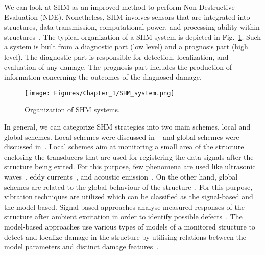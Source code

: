 We can look at SHM as an improved method to perform Non-Destructive Evaluation (NDE). 
Nonetheless, SHM involves sensors that are integrated into structures, data 
transmission, computational power, and processing ability within 
structures~\cite{Balageas2010}. 
The typical organization of a SHM system is depicted in Fig.~\ref{fig:SHMsystem}. 
Such a system is built from a diagnostic part (low level) and a prognosis part (high level).
The diagnostic part is responsible for detection, localization, and evaluation of any damage.
The prognosis part includes the production of information concerning the outcomes of the diagnosed damage.
\begin{figure} [!ht]
	\begin{center}
		\texttt{[image: Figures/Chapter\_1/SHM\_system.png]}
	\end{center}
	\caption{Organization of SHM systems.} 
	\label{fig:SHMsystem}
\end{figure}
In general, we can categorize SHM strategies into two main schemes, local and 
global schemes. Local schemes were discussed in ~\cite{Grimberg2001,Raghavan2007}
and global schemes were discussed in~\cite{Adams2002,Doebling1998,Uhl2004}. 
Local schemes aim at monitoring a small area of the structure enclosing the transducers that are used for registering the data signals after the structure being exited. 
For this purpose, few phenomena are used like ultrasonic waves~\cite{Raghavan2007}, eddy currents~\cite{Grimberg2001}, and acoustic emission~\cite{Grosse2008}. 
On the other hand, global schemes are related to the global behaviour of the structure~\cite{Balageas2010}. 
For this purpose, vibration techniques are utilized which can be classified as the signal-based and the model-based.
Signal-based approaches analyse measured responses of the structure after 
ambient excitation in order to identify possible defects~\cite{Stepinski2013}. 
The model-based approaches use various types of models of a monitored structure 
to detect and localize damage in the structure by utilising relations 
between the model parameters and distinct damage features~\cite{Stepinski2013}. 


